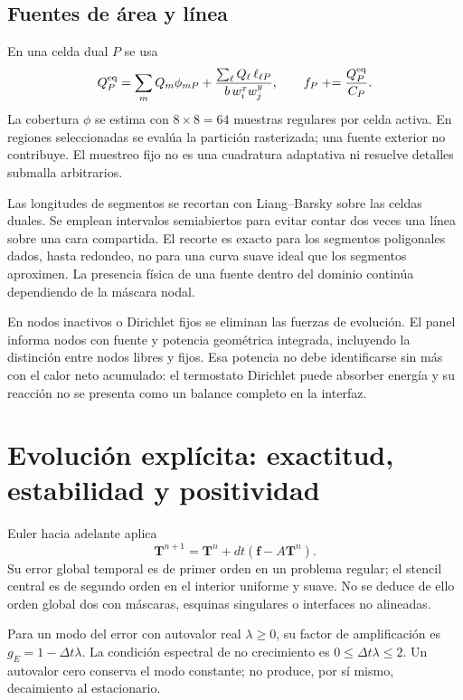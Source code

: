 \documentclass[11pt,a4paper]{article}
\newcommand{\dt}{\Delta t}
\begin{document}
\subsection{Fuentes de área y línea}
En una celda dual $P$ se usa
\begin{equation}
 Q_P^{\rm eq}=\sum_m Q_m\phi_{mP}
 +\frac{\sum_\ell Q_\ell\,\ell_{\ell P}}{b\,w^x_iw^y_j},\qquad
 f_P\mathrel{+}=\frac{Q_P^{\rm eq}}{C_P}.
 \label{eq:sources}
\end{equation}
La cobertura $\phi$ se estima con $8\times8=64$ muestras regulares por celda
activa. En regiones seleccionadas se evalúa la partición rasterizada; una
fuente exterior no contribuye. El muestreo fijo no es una cuadratura adaptativa
ni resuelve detalles submalla arbitrarios.

Las longitudes de segmentos se recortan con Liang--Barsky sobre las celdas
duales. Se emplean intervalos semiabiertos para evitar contar dos veces una
línea sobre una cara compartida. El recorte es exacto para los segmentos
poligonales dados, hasta redondeo, no para una curva suave ideal que los
segmentos aproximen. La presencia física de una fuente dentro del dominio
continúa dependiendo de la máscara nodal.

En nodos inactivos o Dirichlet fijos se eliminan las fuerzas de evolución.
El panel informa nodos con fuente y potencia geométrica integrada, incluyendo
la distinción entre nodos libres y fijos. Esa potencia no debe identificarse
sin más con el calor neto acumulado: el termostato Dirichlet puede absorber
energía y su reacción no se presenta como un balance completo en la interfaz.

\FloatBarrier
\section{Evolución explícita: exactitud, estabilidad y positividad}
\label{sec:explicit}
Euler hacia adelante aplica
\begin{equation}
 \boldsymbol T^{n+1}=\boldsymbol T^n+dt(\boldsymbol f-A\boldsymbol T^n).
 \label{eq:fe}
\end{equation}
Su error global temporal es de primer orden en un problema regular; el stencil
central es de segundo orden en el interior uniforme y suave. No se deduce de
ello orden global dos con máscaras, esquinas singulares o interfaces no
alineadas.

Para un modo del error con autovalor real $\lambda\ge0$, su factor de
amplificación es $g_E=1-\dt\lambda$. La condición espectral de no crecimiento
es $0\le\dt\lambda\le2$. Un autovalor cero conserva el modo constante;
no produce, por sí mismo, decaimiento al estacionario.
\end{document}
